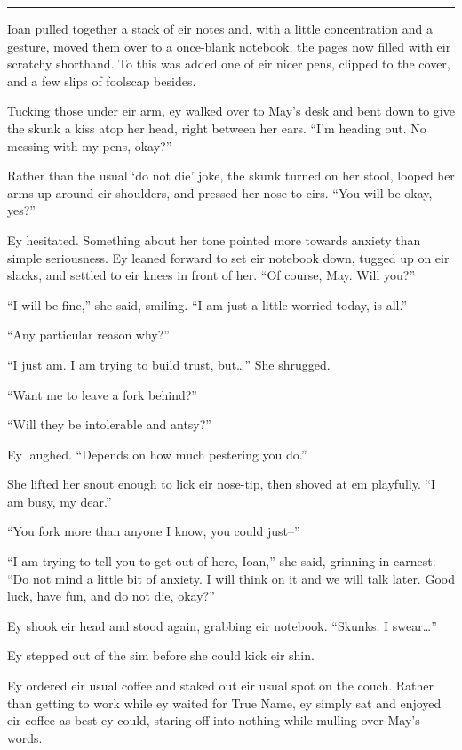 \begin{center}\rule{0.5\linewidth}{0.5pt}\end{center}

Ioan pulled together a stack of eir notes and, with a little concentration and a gesture, moved them over to a once-blank notebook, the pages now filled with eir scratchy shorthand. To this was added one of eir nicer pens, clipped to the cover, and a few slips of foolscap besides.

Tucking those under eir arm, ey walked over to May's desk and bent down to give the skunk a kiss atop her head, right between her ears. ``I'm heading out. No messing with my pens, okay?''

Rather than the usual `do not die' joke, the skunk turned on her stool, looped her arms up around eir shoulders, and pressed her nose to eirs. ``You will be okay, yes?''

Ey hesitated. Something about her tone pointed more towards anxiety than simple seriousness. Ey leaned forward to set eir notebook down, tugged up on eir slacks, and settled to eir knees in front of her. ``Of course, May. Will you?''

``I will be fine,'' she said, smiling. ``I am just a little worried today, is all.''

``Any particular reason why?''

``I just am. I am trying to build trust, but\ldots{}'' She shrugged.

``Want me to leave a fork behind?''

``Will they be intolerable and antsy?''

Ey laughed. ``Depends on how much pestering you do.''

She lifted her snout enough to lick eir nose-tip, then shoved at em playfully. ``I am busy, my dear.''

``You fork more than anyone I know, you could just--''

``I am trying to tell you to get out of here, Ioan,'' she said, grinning in earnest. ``Do not mind a little bit of anxiety. I will think on it and we will talk later. Good luck, have fun, and do not die, okay?''

Ey shook eir head and stood again, grabbing eir notebook. ``Skunks. I swear\ldots{}''

Ey stepped out of the sim before she could kick eir shin.

Ey ordered eir usual coffee and staked out eir usual spot on the couch. Rather than getting to work while ey waited for True Name, ey simply sat and enjoyed eir coffee as best ey could, staring off into nothing while mulling over May's words.

